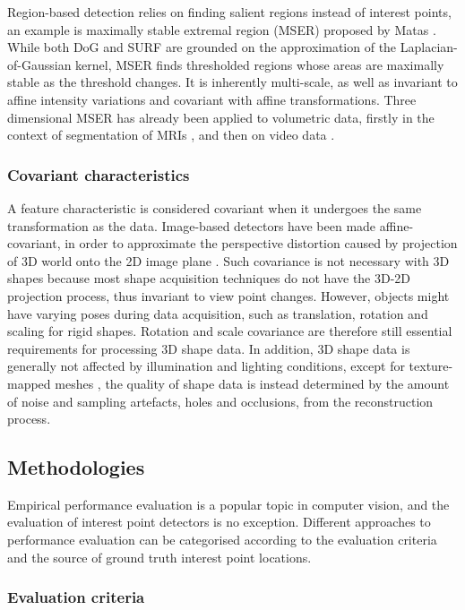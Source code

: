Region-based detection relies on finding salient regions instead of interest points, an example is maximally stable extremal region (MSER) proposed by Matas \etal \cite{Matas2004}. 
While both DoG and SURF are grounded on the approximation of the Laplacian-of-Gaussian kernel, MSER finds thresholded regions whose areas are maximally stable as the threshold changes. 
It is inherently multi-scale, as well as invariant to affine intensity variations and covariant with affine transformations. Three dimensional MSER has already been applied to volumetric data, firstly in the context of segmentation of MRIs \cite{Donoser2006}, and then on video data \cite{Riemenschneider2009}.

\subsubsection{Covariant characteristics}

A feature characteristic is considered covariant when it undergoes the same transformation as the data. 
Image-based detectors have been made affine-covariant, in order to approximate the perspective distortion caused by projection of 3D world onto the 2D image plane \cite{Mikolajczyk2002}. 
Such covariance is not necessary with 3D shapes because most shape acquisition techniques do not have the 3D-2D projection process, thus invariant to view point changes. 
However, objects might have varying poses during data acquisition, such as translation, rotation and scaling for rigid shapes. Rotation and scale covariance are therefore still essential requirements for processing 3D shape data. 
In addition, 3D shape data is generally not affected by illumination and lighting conditions, except for texture-mapped meshes \cite{Zaharescu2009}, the quality of shape data is instead determined by the amount of noise and sampling artefacts, \eg holes and occlusions, from the reconstruction process. 

\subsection{Methodologies}

Empirical performance evaluation is a popular topic in computer vision, and the evaluation of interest point detectors is no exception. Different approaches to performance evaluation can be categorised according to the evaluation criteria and the source of ground truth interest point locations. 

\subsubsection{Evaluation criteria}

